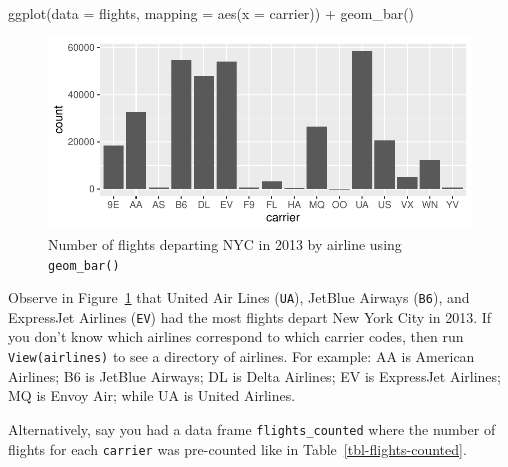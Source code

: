 \documentclass[
  letterpaper,
  DIV=11,
  numbers=noendperiod]{scrreprt}
\newenvironment{Shaded}{\begin{snugshade}}{\end{snugshade}}
\newcommand{\AttributeTok}[1]{\textcolor[rgb]{0.40,0.45,0.13}{#1}}
\newcommand{\FunctionTok}[1]{\textcolor[rgb]{0.28,0.35,0.67}{#1}}
\newcommand{\NormalTok}[1]{\textcolor[rgb]{0.00,0.23,0.31}{#1}}
\newcommand{\SpecialCharTok}[1]{\textcolor[rgb]{0.37,0.37,0.37}{#1}}
\theoremstyle{definition}
\theoremstyle{remark}
\begin{document}
\begin{Shaded}
\begin{Highlighting}[]
\FunctionTok{ggplot}\NormalTok{(}\AttributeTok{data =}\NormalTok{ flights, }\AttributeTok{mapping =} \FunctionTok{aes}\NormalTok{(}\AttributeTok{x =}\NormalTok{ carrier)) }\SpecialCharTok{+}
  \FunctionTok{geom\_bar}\NormalTok{()}
\end{Highlighting}
\end{Shaded}

\begin{figure}[H]

{\centering \includegraphics{02-visualization_files/figure-pdf/fig-flightsbar-1.pdf}

}

\caption{\label{fig-flightsbar}Number of flights departing NYC in 2013
by airline using \texttt{geom\_bar()}}

\end{figure}

Observe in Figure~\ref{fig-flightsbar} that United Air Lines
(\texttt{UA}), JetBlue Airways (\texttt{B6}), and ExpressJet Airlines
(\texttt{EV}) had the most flights depart New York City in 2013. If you
don't know which airlines correspond to which carrier codes, then run
\texttt{View(airlines)} to see a directory of airlines. For example: AA
is American Airlines; B6 is JetBlue Airways; DL is Delta Airlines; EV is
ExpressJet Airlines; MQ is Envoy Air; while UA is United Airlines.

Alternatively, say you had a data frame \texttt{flights\_counted} where
the number of flights for each \texttt{carrier} was pre-counted like in
Table~\ref{tbl-flights-counted}.
\end{document}
